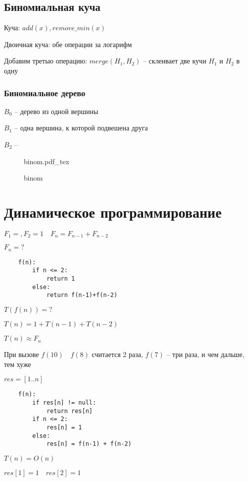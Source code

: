 \documentclass{book}
\theoremstyle{definition}
\newcommand{\incfig}[1]{%
    \def\svgwidth{\columnwidth}
    {#1.pdf_tex}
}
\begin{document}
\subsection{Биномиальная куча}

Куча: $add(x), remove\_min(x)$

Двоичная куча: обе операции за логарифм

Добавим третью операцию:  $merge(H_1, H_2)$ -- склеивает две кучи  $H_1$ и $H_2$  в одну

\subsubsection{Биномиальное дерево}

$B_0$ -- дерево из одной вершины

$B_1$ -- одна вершина, к которой подвешена друга

$B_2$ --

\begin{figure}[ht]
    \centering
    \incfig{binom}
    \caption{binom}
    \label{fig:binom}
\end{figure}

\section{Динамическое программирование}

$F_1 = , F_2=1\quad F_n = F_{n-1} + F_{n-2}$

$F_n = ?$

 \begin{verbatim}
    f(n):
        if n <= 2:
            return 1
        else:
            return f(n-1)+f(n-2)
\end{verbatim}

$T(f(n)) = ?$

$T(n) = 1+T(n-1)+T(n-2)$

$T(n)\approx F_n$

При вызове  $f(10)\quad f(8)$ считается 2 раза,  $f(7)$ -- три раза, и чем дальше, тем хуже

$res = [1..n]$

\begin{verbatim}
    f(n):
        if res[n] != null:
            return res[n]
        if n <= 2:
            res[n] = 1
        else:
            res[n] = f(n-1) + f(n-2)
\end{verbatim}

$T(n) = O(n)$

$res[1]=1\quad res[2]=1$
\end{document}
